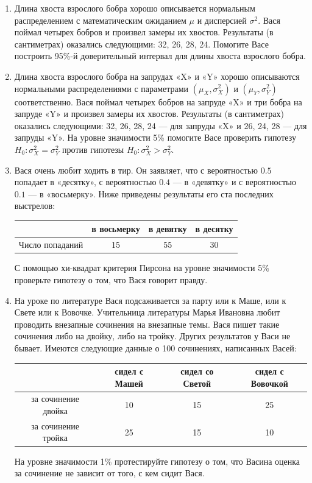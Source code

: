 \begin{enumerate}
\item Длина хвоста взрослого бобра хорошо описывается нормальным распределением с математическим ожиданием $\mu$ и дисперсией $\sigma^2$. 
Вася поймал четырех бобров и произвел замеры их хвостов. 
Результаты (в сантиметрах) оказались следующими: 32, 26, 28, 24. 
Помогите Васе построить 95\%-й доверительный интервал для длины хвоста взрослого бобра.

\item Длина хвоста взрослого бобра на запрудах «X» и «Y» хорошо описываются нормальными распределениями с параметрами $(\mu_{X},\sigma_{X}^2)$ и $(\mu_{Y},\sigma_{Y}^2)$ соответственно. 
Вася поймал четырех бобров на запруде «X» и три бобра на запруде «Y» и произвел замеры их хвостов. 
Результаты (в сантиметрах) оказались следующими: 32, 26, 28, 24 — для запруды «X» и 26, 24, 28 — для запруды «Y». 
На уровне значимости 5\% помогите Васе проверить гипотезу $H_{0}:\sigma_{X}^2=\sigma_{Y}^2$ против гипотезы $H_{0}:\sigma_{X}^2>\sigma_{Y}^2$.

\item Вася очень любит ходить в тир. Он заявляет, что с вероятностью $0.5$  попадает в «десятку», с вероятностью $0.4$  — в «девятку» и с вероятностью $0.1$ — в «восьмерку». 
Ниже приведены результаты его ста последних выстрелов:

	\begin{center}
	\begin{tabular}{cccc}
	&в восьмерку& в девятку& в десятку\\
	\toprule
	Число попаданий & 15 & 55 & 30  \\
	\end{tabular}
\end{center}

С помощью хи-квадрат критерия Пирсона на уровне значимости 5\% проверьте гипотезу о том, что Вася говорит правду.

\item На уроке по литературе Вася подсаживается за парту или к Маше, или к Свете или к Вовочке. 
Учительница литературы Марья Ивановна любит проводить внезапные сочинения на внезапные темы. 
Вася пишет такие сочинения либо на двойку, либо на тройку. Других результатов у Васи не бывает. 
Имеются следующие данные о 100 сочинениях, написанных Васей:
\begin{center}
	\begin{tabular}{cccc}
	& сидел с Машей & сидел со Светой & сидел с Вовочкой\\
	\toprule
	за сочинение двойка & 10 & 15 & 25\\
	за сочинение тройка & 25 & 15 & 10\\
	\end{tabular}
\end{center}
На уровне значимости 1\% протестируйте гипотезу о том, что Васина оценка за сочинение не зависит от того, с кем сидит Вася.


\end{enumerate}
